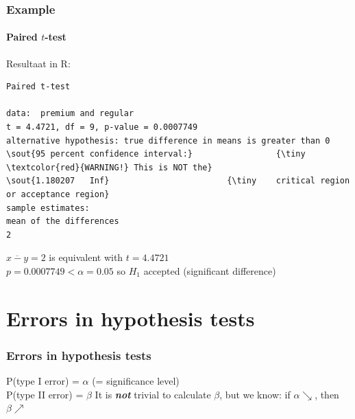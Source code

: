 \documentclass{beamer}
\begin{document}
\begin{frame}[fragile]
\frametitle{Example}
\framesubtitle{Paired $t$-test}
Resultaat in R:
{\footnotesize
\begin{Verbatim}[commandchars=\\\{\}]
Paired t-test

data:  premium and regular
t = 4.4721, df = 9, p-value = 0.0007749
alternative hypothesis: true difference in means is greater than 0
\sout{95 percent confidence interval:}                 {\tiny \textcolor{red}{WARNING!} This is NOT the}
\sout{1.180207   Inf}                        {\tiny    critical region or acceptance region}
sample estimates:
mean of the differences 
2
\end{Verbatim}
}
\vfill
$\overline{x-y}=2$ is equivalent with $t=4.4721$\\
$p = 0.0007749 < \alpha = 0.05$ so $H_1$ accepted (significant difference)
\end{frame}

\section{Errors in hypothesis tests}
\sectionframelogo{}

\begin{frame}
  \frametitle{Errors in hypothesis tests}

  \begin{table}
    \centering
  \end{table}
\vfill
P(type I error) = $\alpha$ (= significance level)\\
P(type II error) = $\beta$
\vfill
It is \textbf{\textit{not}} trivial to calculate $\beta$,
but we know: if $\alpha \searrow$, then $\beta \nearrow$ 

\end{frame}
\end{document}
